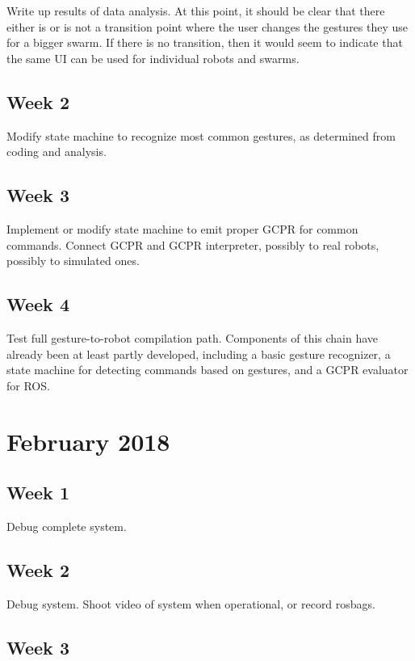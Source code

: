 Write up results of data analysis.
At this point, it should be clear that there either is or is not a transition point where the user changes the gestures they use for a bigger swarm. 
If there is no transition, then it would seem to indicate that the same UI can be used for individual robots and swarms. 

\subsection{Week 2}

Modify state machine to recognize most common gestures, as determined from coding and analysis. 

\subsection{Week 3}

Implement or modify state machine to emit proper GCPR for common commands. 
Connect GCPR and GCPR interpreter, possibly to real robots, possibly to simulated ones. 
 
\subsection{Week 4}

Test full gesture-to-robot compilation path. Components of this chain have already been at least partly developed, including a basic gesture recognizer, a state machine for detecting commands based on gestures, and a GCPR evaluator for ROS.

\section{February 2018}

\subsection{Week 1}

Debug complete system. 

\subsection{Week 2}

Debug system. 
Shoot video of system when operational, or record rosbags. 

\subsection{Week 3}

